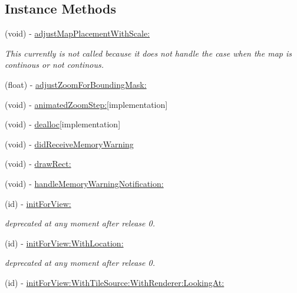 \subsection*{Instance Methods}
\begin{DoxyCompactItemize}
\item 
(void) -\/ \hyperlink{interface_r_m_map_contents_ad5e13a19a28049128f6a9eb36415eb71}{adjust\-Map\-Placement\-With\-Scale\-:}
\begin{DoxyCompactList}\small\item\em This currently is not called because it does not handle the case when the map is continous or not continous. \end{DoxyCompactList}\item 
(float) -\/ \hyperlink{interface_r_m_map_contents_a08e2f802b9fa6d0cfe3478725684545e}{adjust\-Zoom\-For\-Bounding\-Mask\-:}
\item 
(void) -\/ \hyperlink{interface_r_m_map_contents_a1d3d6d5bd375efa2b6926494150a2f4f}{animated\-Zoom\-Step\-:}{\ttfamily  \mbox{[}implementation\mbox{]}}
\item 
(void) -\/ \hyperlink{interface_r_m_map_contents_a528c6e073c6c8308771f9d71f16a9bf4}{dealloc}{\ttfamily  \mbox{[}implementation\mbox{]}}
\item 
(void) -\/ \hyperlink{interface_r_m_map_contents_ad715d6e1088cf3994b26f7ab6cacf391}{did\-Receive\-Memory\-Warning}
\item 
(void) -\/ \hyperlink{interface_r_m_map_contents_a5bcdc830d59d045abc4fdf2c57fef8cb}{draw\-Rect\-:}
\item 
(void) -\/ \hyperlink{interface_r_m_map_contents_a5e5cb1f8dbb78ee775e5ccc9703ceb3f}{handle\-Memory\-Warning\-Notification\-:}
\item 
(id) -\/ \hyperlink{interface_r_m_map_contents_a3f56aed0e38083d5fc613887f626210b}{init\-For\-View\-:}
\begin{DoxyCompactList}\small\item\em deprecated at any moment after release 0. \end{DoxyCompactList}\item 
(id) -\/ \hyperlink{interface_r_m_map_contents_a5ac0e7aeea1edca790b2466a62714786}{init\-For\-View\-:\-With\-Location\-:}
\begin{DoxyCompactList}\small\item\em deprecated at any moment after release 0. \end{DoxyCompactList}\item 
(id) -\/ \hyperlink{interface_r_m_map_contents_ac88a327e2895d4d95c9fc829ab99294d}{init\-For\-View\-:\-With\-Tile\-Source\-:\-With\-Renderer\-:\-Looking\-At\-:}

\end{DoxyCompactItemize}
